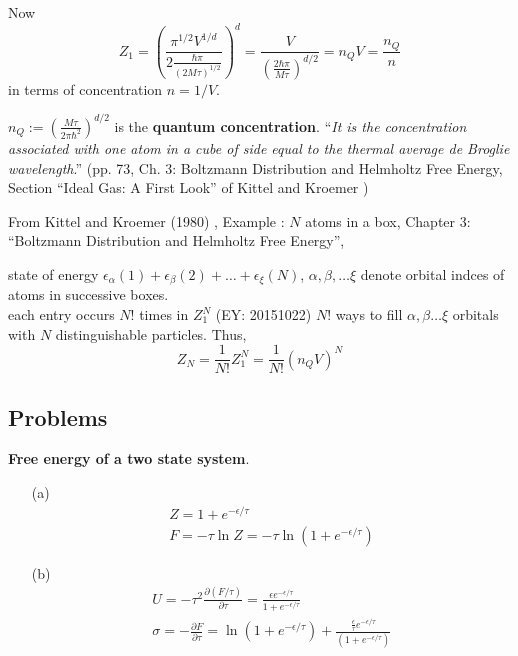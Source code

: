 \documentclass[twoside]{amsart}
\theoremstyle{plain}
\theoremstyle{definition}
\newcommand{\solutionhead}[1]
  {
   \noindent{\small\bf Solution #1.}
   }
\begin{document}
Now 
\[
Z_1 = \left( \frac{ \pi^{1/2} V^{1/d} }{ 2 \frac{ \hbar \pi }{ (2M \tau)^{1/2} } } \right)^d = \frac{V}{ \left( \frac{2 \hbar \pi }{ M \tau } \right)^{d/2} } = n_Q V = \frac{n_Q}{n}
\]
in terms of concentration $n=1/V$.  

$n_Q := \left( \frac{M\tau}{ 2\pi \hbar^2} \right)^{d/2}$ is the \textbf{quantum concentration}.  ``\emph{It is the concentration associated with one atom in a cube of side equal to the thermal average de Broglie wavelength}.'' (pp. 73, Ch. 3: Boltzmann Distribution and Helmholtz Free Energy, Section ``Ideal Gas: A First Look'' of Kittel and Kroemer \cite{CKittelHKroemer1980})



From Kittel and Kroemer (1980) \cite{CKittelHKroemer1980}, Example : $N$ atoms in a box, Chapter 3: ``Boltzmann Distribution and Helmholtz Free Energy'', 

state of energy $\epsilon_{\alpha}(1) + \epsilon_{\beta}(2) + \dots + \epsilon_{\xi}(N)$, $\alpha, \beta, \dots \xi$ denote orbital indces of atoms in successive boxes.  \\
each entry occurs $N!$ times in $Z_1^N$ (EY: 20151022) $N!$ ways to fill $\alpha, \beta \dots \xi$ orbitals with $N$ distinguishable particles.  Thus,
\[
Z_N = \frac{1}{N!} Z_1^N = \frac{1}{N!} (n_Q V)^N
\]


\subsection*{Problems}

\solutionhead{1} \textbf{Free energy of a two state system}.  \begin{itemize}
\item[(a)] 
\[
\begin{gathered}
  Z = 1 + e^{-\epsilon/\tau} \\
  F = -\tau \ln{Z} = -\tau \ln{ ( 1 + e^{-\epsilon/\tau} ) }
\end{gathered}
\]
\item[(b)] 
\[
\begin{gathered}
  U = - \tau^2 \frac{ \partial (F/\tau )}{ \partial \tau} = \frac{ \epsilon e^{-\epsilon/\tau } }{ 1 + e^{-\epsilon/\tau} } \\
  \sigma = - \frac{ \partial F}{\partial \tau} = \ln{ ( 1 + e^{-\epsilon/\tau} ) } + \frac{ \frac{ \epsilon }{\tau} e^{-\epsilon/\tau } }{ ( 1 + e^{-\epsilon/\tau } ) }
\end{gathered}
\]
\end{itemize}
\end{document}
